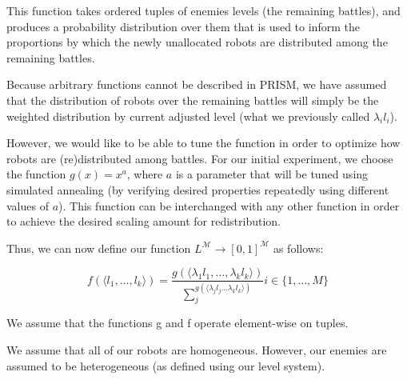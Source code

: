 \documentclass{article}
\theoremstyle{definition}
\begin{document}
This function takes ordered tuples of enemies levels (the remaining battles),
and produces a probability distribution
over them that is used to inform the proportions by which the newly unallocated
robots are distributed among the remaining battles.

Because arbitrary functions cannot be described in PRISM, we have assumed
that the distribution of robots over the remaining battles will simply be the weighted distribution
by current adjusted level (what we previously called $ \lambda_i l_i $).

However, we would like to be able to tune the function in order
to optimize how robots are (re)distributed among battles.
For our initial experiment, we choose the function $ g(x) = x^a $,
where $ a $ is a parameter that will be tuned using
simulated annealing (by verifying desired properties repeatedly
using different values of $ a $). This function can be interchanged
with any other function in order to achieve the desired scaling amount
for redistribution.

Thus, we can now define our
function $ L^\mathcal{M} \to [0,1]^\mathcal{M} $ as follows:

$$ f(\langle l_1, \ldots, l_k \rangle) = \frac{g(\langle \lambda_1 l_1, \ldots, \lambda_k l_k \rangle)}{\sum_j^{g(\langle \lambda_j l_j \ldots \lambda_k l_k \rangle)}} i \in \{1, \ldots, M\} $$

We assume that the functions g and f operate element-wise on tuples.

We assume that all of our robots are homogeneous.
However, our enemies are assumed to be heterogeneous
(as defined using our level system).
\end{document}
